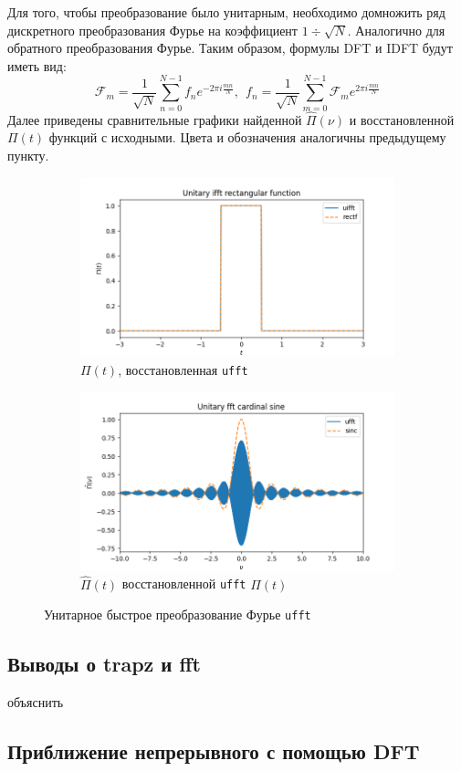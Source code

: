 \documentclass[a4paper, 12pt]{article}
\begin{document}
    Для того, чтобы преобразование было унитарным, необходимо домножить ряд дискретного преобразования Фурье
    на коэффициент $1\div\sqrt{N}$. Аналогично для обратного преобразования Фурье. Таким образом, формулы DFT и IDFT будут
    иметь вид:
    $$
    \mathcal{F}_m = \dfrac{1}{\sqrt{N}}\sum\limits_{n=0}^{N-1}f_ne^{-2\pi i \frac{mn}{N}},\ \ f_n=\dfrac{1}{\sqrt{N}}\sum\limits_{m=0}^{N-1}\mathcal{F}_me^{2\pi i\frac{mn}{N}}
    $$
    Далее приведены сравнительные графики найденной $\hat{\Pi}(\nu)$ и восстановленной $\Pi(t)$ функций с исходными. Цвета и обозначения аналогичны предыдущему пункту.
    \begin{figure}[H]
        \centering
        \begin{subfigure}{0.45\textwidth}
            \centering
            \includegraphics[width=\linewidth]{uifft.png}
            \caption{$\Pi(t)$, восстановленная \texttt{ufft}}
            \label{fig:uifft}
        \end{subfigure}
        \hspace{5mm}
        \begin{subfigure}{0.45\textwidth}
            \centering
            \includegraphics[width=\linewidth]{ufft.png}
            \caption{$\hat{\Pi}(t)$ восстановленной \texttt{ufft} $\Pi(t)$}
            \label{fig:ufft}
        \end{subfigure}
        \caption{Унитарное быстрое преобразование Фурье \texttt{ufft}}
        \label{fig:uffts}
    \end{figure}


    \subsection{Выводы о trapz и fft}
    объяснить


    \subsection{Приближение непрерывного с помощью DFT}
\end{document}
